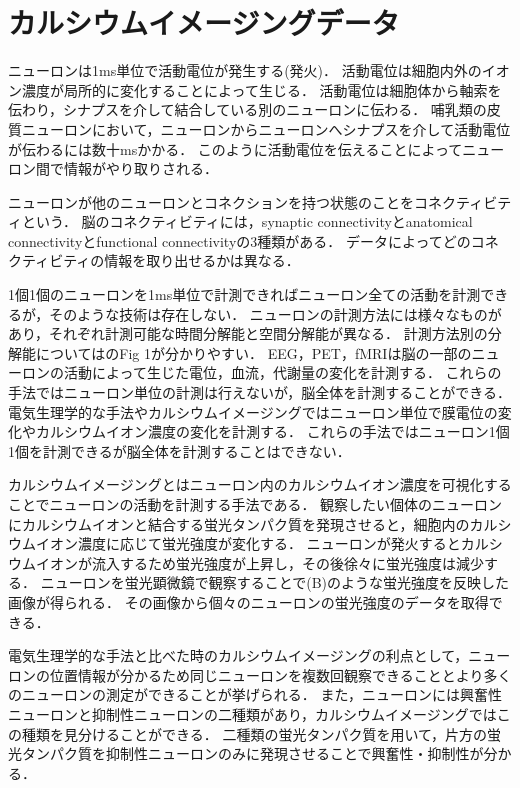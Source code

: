 \section{カルシウムイメージングデータ}
ニューロンは1ms単位で活動電位が発生する(発火)．
活動電位は細胞内外のイオン濃度が局所的に変化することによって生じる．
活動電位は細胞体から軸索を伝わり，シナプスを介して結合している別のニューロンに伝わる．
哺乳類の皮質ニューロンにおいて，ニューロンからニューロンへシナプスを介して活動電位が伝わるには数十msかかる\cite{Izhikevich2004}．
このように活動電位を伝えることによってニューロン間で情報がやり取りされる．

ニューロンが他のニューロンとコネクションを持つ状態のことをコネクティビティという．
脳のコネクティビティには，synaptic connectivityとanatomical connectivityとfunctional connectivityの3種類がある．
データによってどのコネクティビティの情報を取り出せるかは異なる．

1個1個のニューロンを1ms単位で計測できればニューロン全ての活動を計測できるが，そのような技術は存在しない．
ニューロンの計測方法には様々なものがあり，それぞれ計測可能な時間分解能と空間分解能が異なる．
計測方法別の分解能については\cite{Sejnowski2014}のFig 1が分かりやすい．
EEG，PET，fMRIは脳の一部のニューロンの活動によって生じた電位，血流，代謝量の変化を計測する．
これらの手法ではニューロン単位の計測は行えないが，脳全体を計測することができる．
電気生理学的な手法やカルシウムイメージングではニューロン単位で膜電位の変化やカルシウムイオン濃度の変化を計測する．
これらの手法ではニューロン1個1個を計測できるが脳全体を計測することはできない．

カルシウムイメージングとはニューロン内のカルシウムイオン濃度を可視化することでニューロンの活動を計測する手法である．
観察したい個体のニューロンにカルシウムイオンと結合する蛍光タンパク質を発現させると，細胞内のカルシウムイオン濃度に応じて蛍光強度が変化する．
ニューロンが発火するとカルシウムイオンが流入するため蛍光強度が上昇し，その後徐々に蛍光強度は減少する．
ニューロンを蛍光顕微鏡で観察することで(B)のような蛍光強度を反映した画像が得られる．
その画像から個々のニューロンの蛍光強度のデータを取得できる．

電気生理学的な手法と比べた時のカルシウムイメージングの利点として，ニューロンの位置情報が分かるため同じニューロンを複数回観察できることとより多くのニューロンの測定ができることが挙げられる．
また，ニューロンには興奮性ニューロンと抑制性ニューロンの二種類があり，カルシウムイメージングではこの種類を見分けることができる．
二種類の蛍光タンパク質を用いて，片方の蛍光タンパク質を抑制性ニューロンのみに発現させることで興奮性・抑制性が分かる．


